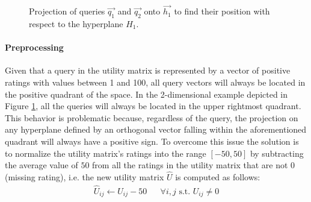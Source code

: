 \begin{figure}[h]
\caption{\normalfont Projection of queries $\vec{q_1}$ and $\vec{q_2}$ onto $\vec{h_1}$ to find their position with respect to the hyperplane $H_1$.} 
\label{fig:projection}
\end{figure}




\paragraph{Preprocessing} Given that a query in the utility matrix is represented by a vector of positive ratings with values between 1 and 100, all query vectors will always be located in the positive quadrant of the space. In the 2-dimensional example depicted in Figure \ref{fig:projection}, all the queries will always be located in the upper rightmost quadrant. This behavior is problematic because, regardless of the query, the projection on any hyperplane defined by an orthogonal vector falling within the aforementioned quadrant will always have a positive sign. To overcome this issue the solution is to normalize the utility matrix's ratings into the range $[-50,50]$ by subtracting the average value of $50$ from all the ratings in the utility matrix that are not $0$(missing rating), i.e. the new utility matrix $\widehat{U}$ is computed as follows:
\begin{equation}
\begin{aligned}
\widehat{U}_{ij} \gets U_{ij} - 50   && \forall i,j  \text{ s.t. } U_{ij} \neq 0
\end{aligned}
\end{equation}

